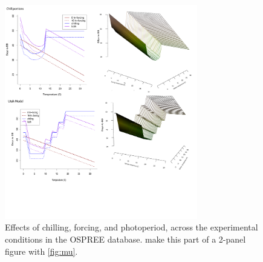 \documentclass[11pt,letter]{article}
\begin{document}
\newpage
\begin{figure}[h!]
\centering
\noindent \includegraphics[width=0.75\textwidth]{..//..//analyses/bb_analysis/figures/bbmod_3dplot_4panels.pdf}
\caption{Effects of chilling, forcing, and photoperiod, across the experimental conditions in the OSPREE database. make this part of a 2-panel figure with \ref{fig:mu}.}
\label{fig:apc}
\end{figure}


\newpage
\end{document}
